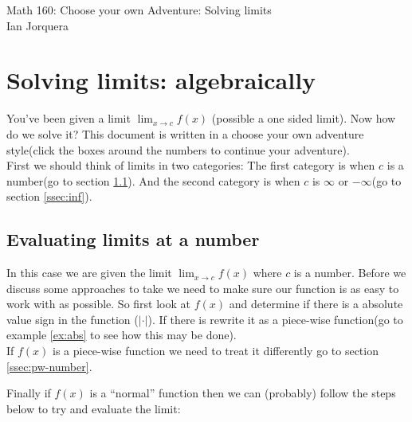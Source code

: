 \documentclass[12pt]{article}
\begin{document}

\begin{center}
    \Large Math 160: Choose your own Adventure: Solving limits\\
    Ian Jorquera 
\end{center}

\section{Solving limits: algebraically}

You've been given a limit $\displaystyle{\lim_{x\to c}f(x)}$ (possible a one sided limit). Now how do we solve it? This document is written in a choose your own adventure style(click the boxes around the numbers to continue your adventure).\\

First we should think of limits in two categories: The first category is when $c$ is a number(go to section \ref{ssec:number}). And the second category is when $c$ is $\infty$ or $-\infty$(go to section \ref{ssec:inf}).\\

\subsection{Evaluating limits at a number}
\label{ssec:number}
In this case we are given the limit $\displaystyle{\lim_{x\to c}f(x)}$ where $c$ is a number. Before we discuss some approaches to take we need to make sure our function is as easy to work with as possible. So first look at $f(x)$ and determine if there is a absolute value sign in the function ($|\cdot|$). If there is rewrite it as a piece-wise function(go to example \ref{ex:abs} to see how this may be done).\\

If $f(x)$ is a piece-wise function we need to treat it differently go to section \ref{ssec:pw-number}.

Finally if $f(x)$ is a ``normal'' function then we can (probably) follow the steps below to try and evaluate the limit:
\end{document}
